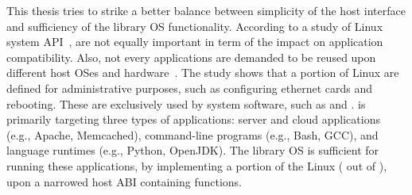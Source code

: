 This thesis tries to strike a better balance %
between simplicity of the host interface
and sufficiency of the library OS functionality. %
According to
a study of Linux system API~\cite{tsai16apistudy},
\linuxapis{} are not equally important in term of the impact on application compatibility.
Also, not every applications are demanded to be reused upon different host OSes and hardware~\cite{ubuntu-popularity}.
The study shows that
a portion of Linux \linuxapis{} are defined for administrative purposes,
such as configuring ethernet cards and rebooting.
These \linuxapis{} are exclusively used by
system software,
such as  and .
\graphene{} is primarily targeting three types of applications:
server and cloud applications (e.g., Apache, Memcached), command-line programs (e.g., Bash, GCC), and language runtimes (e.g., Python, OpenJDK).
The \graphene{} library OS is sufficient for running these applications,
by implementing a portion of the Linux \linuxapis{} (\graphenesyscallnum{} out of \linuxsyscallnum{}),
upon a narrowed host ABI containing \palcallnum{} functions.









